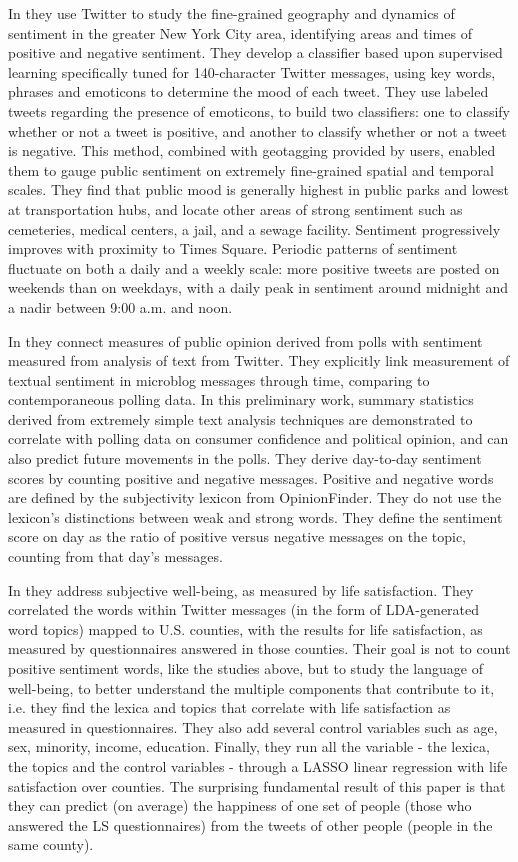 \documentclass{llncs}
\begin{document}
In \cite{Bertrand2013} they use Twitter to study the fine-grained geography and dynamics of sentiment in the greater New York City area, identifying areas and times of positive and negative sentiment. They develop a classifier based upon supervised learning specifically tuned for 140-character Twitter messages, using key words, phrases and emoticons to determine the mood of each tweet. They use labeled tweets regarding the presence of emoticons, to build two classifiers: one to classify whether or not a tweet is positive, and another to classify whether or not a tweet is negative. This method, combined with geotagging provided by users, enabled them to gauge public sentiment on extremely fine-grained spatial and temporal scales. They find that public mood is generally highest in public parks and lowest at transportation hubs, and locate other areas of strong sentiment such as cemeteries, medical centers, a jail, and a sewage facility. Sentiment progressively improves with proximity to Times Square. Periodic patterns of sentiment fluctuate on both a daily and a weekly scale: more positive tweets are posted on weekends than on weekdays, with a daily peak in sentiment around midnight and a nadir between 9:00 a.m. and noon.

In \cite{Connor2010} they connect measures of public opinion derived from polls with sentiment measured from analysis of text from Twitter. They explicitly link measurement of textual sentiment in microblog messages through time, comparing to contemporaneous polling data. In this preliminary work, summary statistics derived from extremely simple text analysis techniques are demonstrated to correlate with polling data on consumer confidence and political opinion, and can also predict future movements in the polls. They derive day-to-day sentiment scores by counting positive and negative messages. Positive and negative words are defined by the subjectivity lexicon from OpinionFinder. They do not use the lexicon's distinctions between weak and strong words. They define the sentiment score on day as the ratio of positive versus negative messages on the topic, counting from that day's messages.

In \cite{Schwartz2013} they address subjective well-being, as measured by life satisfaction. They correlated the words within Twitter messages (in the form of LDA-generated word topics) mapped to U.S. counties, with the results for life satisfaction, as measured by questionnaires answered in those counties. Their goal is not to count positive sentiment words, like the studies above, but to study the language of well-being, to better understand the multiple components that contribute to it, i.e. they find the lexica and topics that correlate with life satisfaction as measured in questionnaires. They also add several control variables such as age, sex, minority, income, education. Finally, they run all the variable - the lexica, the topics and the control variables - through a LASSO linear regression with life satisfaction over counties. The surprising fundamental result of this paper is that they can predict (on average) the happiness of one set of people (those who answered the LS questionnaires) from the tweets of other people (people in the same county).
\end{document}
